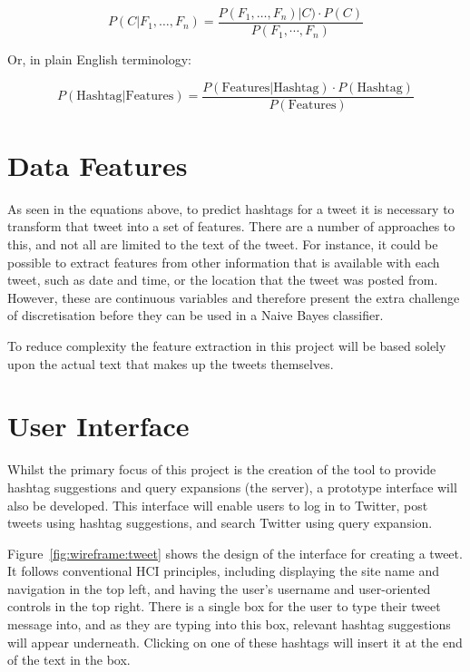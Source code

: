 \documentclass[11pt,a4paper]{report}
\begin{document}
\begin{equation}
    P(C|F_1,\dots,F_n) = \frac{P(F_1,\dots,F_n)|C) \cdot P(C)}{P(F_1,\cdots,F_n)}
\end{equation}

Or, in plain English terminology:

\begin{equation}
    P(\text{Hashtag}|\text{Features}) = \frac{P(\text{Features}|\text{Hashtag}) \cdot P(\text{Hashtag})}{P(\text{Features})}
\end{equation}

\section{Data Features}
As seen in the equations above, to predict hashtags for a tweet it is necessary to transform that tweet into a set of features. There are a number of approaches to this, and not all are limited to the text of the tweet. For instance, it could be possible to extract features from other information that is available with each tweet, such as date and time, or the location that the tweet was posted from. However, these are continuous variables and therefore present the extra challenge of discretisation before they can be used in a Naive Bayes classifier.

To reduce complexity the feature extraction in this project will be based solely upon the actual text that makes up the tweets themselves.

\section{User Interface}
\label{sec:wireframes}
Whilst the primary focus of this project is the creation of the tool to provide hashtag suggestions and query expansions (the server), a prototype interface will also be developed. This interface will enable users to log in to Twitter, post tweets using hashtag suggestions, and search Twitter using query expansion.

Figure~\ref{fig:wireframe:tweet} shows the design of the interface for creating a tweet. It follows conventional HCI principles, including displaying the site name and navigation in the top left, and having the user's username and user-oriented controls in the top right. There is a single box for the user to type their tweet message into, and as they are typing into this box, relevant hashtag suggestions will appear underneath. Clicking on one of these hashtags will insert it at the end of the text in the box.
\end{document}
